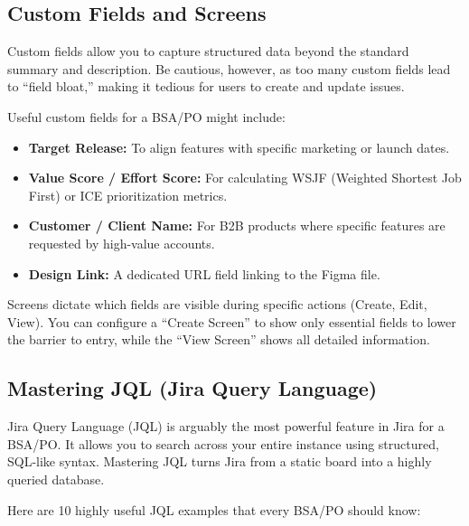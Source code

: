 \documentclass[
  11pt,
  openany,
  oneside]{book}
\providecommand{\tightlist}{%
  \setlength{\itemsep}{0pt}\setlength{\parskip}{0pt}}
\begin{document}
\subsection{Custom Fields and Screens}\label{custom-fields-and-screens}

Custom fields allow you to capture structured data beyond the standard
summary and description. Be cautious, however, as too many custom fields
lead to ``field bloat,'' making it tedious for users to create and
update issues.

Useful custom fields for a BSA/PO might include:

\begin{itemize}
\tightlist
\item
  \textbf{Target Release:} To align features with specific marketing or
  launch dates.
\item
  \textbf{Value Score / Effort Score:} For calculating WSJF (Weighted
  Shortest Job First) or ICE prioritization metrics.
\item
  \textbf{Customer / Client Name:} For B2B products where specific
  features are requested by high-value accounts.
\item
  \textbf{Design Link:} A dedicated URL field linking to the Figma file.
\end{itemize}

Screens dictate which fields are visible during specific actions
(Create, Edit, View). You can configure a ``Create Screen'' to show only
essential fields to lower the barrier to entry, while the ``View
Screen'' shows all detailed information.

\subsection{Mastering JQL (Jira Query
Language)}\label{mastering-jql-jira-query-language}

Jira Query Language (JQL) is arguably the most powerful feature in Jira
for a BSA/PO. It allows you to search across your entire instance using
structured, SQL-like syntax. Mastering JQL turns Jira from a static
board into a highly queried database.

Here are 10 highly useful JQL examples that every BSA/PO should know:
\end{document}
